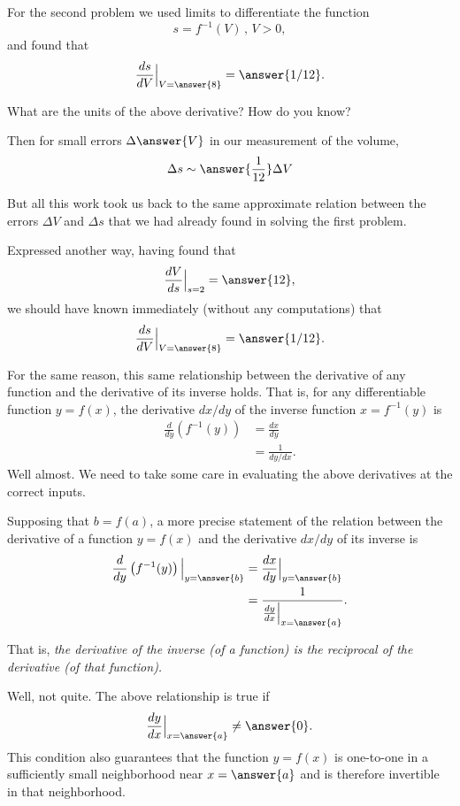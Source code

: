 \documentclass{ximera}
\begin{document}
For the second problem we used limits to differentiate the function
\[
    s = f^{-1}(V) \, , \, V>0 ,
\] 
and found that
\[
    \frac{ds}{dV}\Big|_{V=\answer{8}} = \answer{1/12}. 
\]
\begin{question}  \label{Q:Lldfb9833}
What are the units of the above derivative? How do you know?
\end{question}

Then for small errors  $\Delta \answer{V}$ in our measurement of the volume,
\[
  \Delta s \sim \answer{\frac{1}{12}} \Delta V
\]

But all this work took us back to the same approximate relation between the errors $\Delta V$ and $\Delta s$ that we had already found in solving the first problem.

Expressed another way, having found that
\[
        \frac{dV}{ds}\Big|_{s=2} = \answer{12},
\]
we should have known immediately (without any computations) that
\[
        \frac{ds}{dV}\Big|_{V=\answer{8}} = \answer{1/12}.
\]



For the same reason, this same relationship between the derivative of any function and the derivative of its inverse holds. That is, for any differentiable function $y=f(x)$, the derivative $dx/dy$ of the inverse function $x = f^{-1}(y)$ is
\begin{align*}
\frac{d}{dy} \left(  f^{-1}(y)  \right)  &= \frac{dx}{dy}  \\
                                                      & = \frac{1}{dy/dx} .
\end{align*}
Well almost. We need to take some care in evaluating the above derivatives at the correct inputs.

Supposing that $b = f(a)$, a more precise statement of the relation between the derivative of a function $y=f(x)$ and the derivative $dx/dy$ of its inverse is
\begin{align*}
\frac{d}{dy} \left(  f^{-1}(y)  \right)\Big|_{y=\answer{b}}  &= \frac{dx}{dy} \Big|_{y=\answer{b}} \\
                                                      & = \frac{1}{\frac{dy}{dx} \Big|_{x=\answer{a}}} .
\end{align*}

That is, \emph{the derivative of the inverse (of a function) is the reciprocal of the derivative (of that function).}

Well, not quite. The above relationship is true if
\[
  \frac{dy}{dx} \Big|_{x=\answer{a}} \neq \answer{0}.
\]
This condition also guarantees that the function $y=f(x)$ is one-to-one in a sufficiently small neighborhood near $x=\answer{a}$ and is therefore invertible in that neighborhood.
\end{document}
